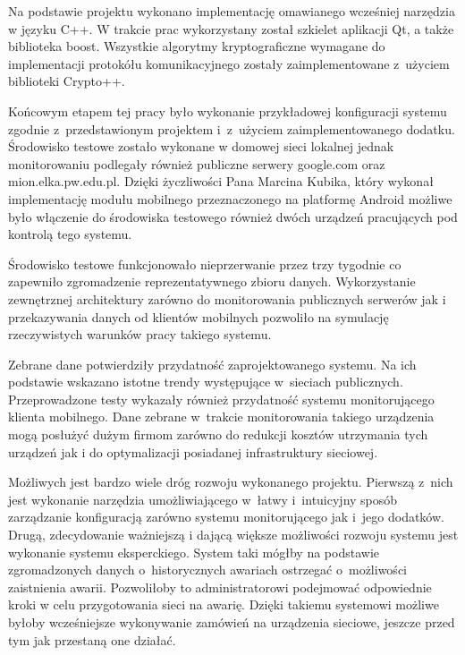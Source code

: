 Na podstawie projektu wykonano implementację omawianego wcześniej
narzędzia w języku C++. W trakcie prac wykorzystany został szkielet
aplikacji Qt, a także biblioteka boost. Wszystkie algorytmy
kryptograficzne wymagane do implementacji protokółu komunikacyjnego
zostały zaimplementowane z~użyciem biblioteki Crypto++.

Końcowym etapem tej pracy było wykonanie przykładowej konfiguracji
systemu zgodnie z~przedstawionym projektem i~z~użyciem
zaimplementowanego dodatku. Środowisko testowe zostało wykonane w
domowej sieci lokalnej jednak monitorowaniu podlegały również
publiczne serwery google.com oraz mion.elka.pw.edu.pl. Dzięki
życzliwości Pana Marcina Kubika, który wykonał implementację modułu
mobilnego przeznaczonego na platformę Android możliwe było włączenie
do środowiska testowego również dwóch urządzeń pracujących pod
kontrolą tego systemu.

Środowisko testowe funkcjonowało nieprzerwanie przez trzy tygodnie co
zapewniło zgromadzenie reprezentatywnego zbioru danych. Wykorzystanie
zewnętrznej architektury zarówno do monitorowania publicznych serwerów
jak i przekazywania danych od klientów mobilnych pozwoliło na
symulację rzeczywistych warunków pracy takiego systemu.

Zebrane dane potwierdziły przydatność zaprojektowanego systemu. Na ich
podstawie wskazano istotne trendy występujące w~sieciach
publicznych. Przeprowadzone testy wykazały również przydatność systemu
monitorującego klienta mobilnego. Dane zebrane w~trakcie monitorowania
takiego urządzenia mogą posłużyć dużym firmom zarówno do redukcji
kosztów utrzymania tych urządzeń jak i do optymalizacji posiadanej
infrastruktury sieciowej.

Możliwych jest bardzo wiele dróg rozwoju wykonanego projektu. Pierwszą
z~nich jest wykonanie narzędzia umożliwiającego w~łatwy i~intuicyjny
sposób zarządzanie konfiguracją zarówno systemu monitorującego jak
i~jego dodatków. Drugą, zdecydowanie ważniejszą i dającą większe
możliwości rozwoju systemu jest wykonanie systemu eksperckiego. System
taki mógłby na podstawie zgromadzonych danych o~historycznych awariach
ostrzegać o~możliwości zaistnienia awarii. Pozwoliłoby to
administratorowi podejmować odpowiednie kroki w celu przygotowania
sieci na awarię. Dzięki takiemu systemowi możliwe byłoby wcześniejsze
wykonywanie zamówień na urządzenia sieciowe, jeszcze przed tym jak
przestaną one działać.
